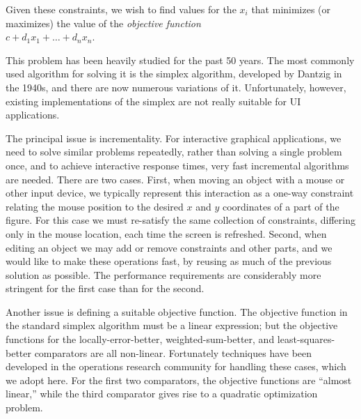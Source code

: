 \documentclass{article}
\newcommand{\ignore}[1]{}
\begin{document}
Given these constraints, we wish to find values for the $x_i$ that minimizes 
(or maximizes) the value of the {\em objective function} \\
\vspace*{2mm}
\hspace*{5mm}$c + d_1 x_1 + \ldots + d_n x_n$.

This problem has been heavily studied for the past 50 years.  The most
commonly used algorithm for solving it is the simplex algorithm, developed
by Dantzig in the 1940s, and there are now numerous variations of it. 
Unfortunately, however, existing implementations of the simplex
are not really suitable for UI applications.

The principal issue is incrementality.  For interactive graphical
applications, we need to solve similar problems repeatedly, rather than
solving a single problem once, and to achieve interactive response times,
very fast incremental algorithms are needed.  There are two cases.  First, when
moving an object with a mouse or other input device, we typically represent
this interaction as a one-way constraint relating the mouse position to the
desired $x$ and $y$ coordinates of a part of the figure.  For this case we
must re-satisfy the same collection of constraints, differing only in the
mouse location, each time the screen is refreshed.  Second, when editing an
object we may add or remove constraints and other parts, and we would like
to make these operations fast, by reusing as much of the previous solution
as possible.  The performance requirements are considerably more stringent
for the first case than for the second.  
\ignore{In Sections \ref{resolving} and
\ref{quadratic} we describe how to update an existing solution rapidly
given new inputs (e.g.\ a new mouse position), while in Sections
\ref{adding-constraints} and \ref{removing-constraints} we describe how to
add or delete a constraint incrementally.}

Another issue is defining a suitable objective function.  The objective
function in the standard simplex algorithm must be a linear expression; but
the objective functions for the locally-error-better,
weighted-sum-better, and least-squares-better comparators are all
non-linear.  Fortunately techniques have been developed in the operations
research community for handling these cases, which we adopt here.  For the
first two comparators, the objective functions are ``almost linear,''
while the third comparator gives rise to a quadratic
optimization problem.
\ignore{leading to the quasi-linear optimization technique described in Section
\ref{quasi-linear}.  Least-squares-better results in a quadratic
optimization problem, which is solved using the technique described in
Section \ref{quadratic}. } 
\end{document}
